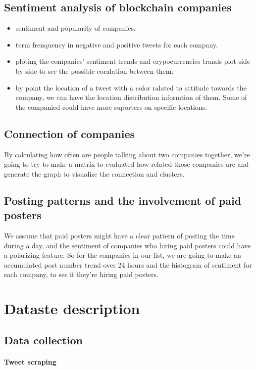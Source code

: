 \documentclass{article}
\begin{document}
\subsection{Sentiment analysis of blockchain companies}
\begin{itemize}
\item sentiment and popularity of companies.
\item term frenquency in negative and positive tweets for each company.
\item ploting the companies' sentiment trends and crypocurrencies trands plot side by side to see the possible coralation between them.
\item by point the location of a tweet with a color ralated to attitude towords the company, we can have the location distribution informtion of them. Some of the companied could have more suporters on specific locations.
\end{itemize}

\subsection{Connection of companies}
By calculating how often are people talking about two companies together, we're going to try to make a matrix to evaluated how related those companies are and generate the graph to visualize the connection and clusters.

\subsection{Posting patterns and the involvement of paid posters}
We assume that paid posters might have a clear pattern of posting the time during a day, and the sentiment of companies who hiring paid posters could have a polarizing feature. So for the companies in our list, we are going to make an accumulated post number trend over 24 hours and the histogram of sentiment for each company, to see if they're hiring paid posters.

\section{Dataste description}
\subsection{Data collection}
\paragraph{Tweet scraping} 
\end{document}
